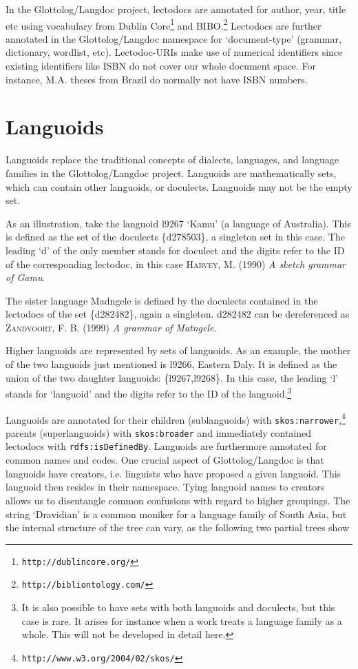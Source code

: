 \documentclass{llncs}
\begin{document}
In the Glottolog/Langdoc project, lectodocs are annotated for author, year, title etc using vocabulary from Dublin Core\footnote{\texttt{http://dublincore.org/}} and BIBO.\footnote{\texttt{http://bibliontology.com/}} Lectodocs are further annotated in the Glottolog/Langdoc namespace for `document-type' (grammar, dictionary, wordlist, etc). Lectodoc-URIs make use of numerical identifiers since existing identifiers like ISBN do not cover our whole document space. For instance, M.A. theses from Brazil do normally not have ISBN numbers.

\section{Languoids}
Languoids replace the traditional concepts of dialects, languages, and language families in the Glottolog/Langdoc project. Languoids are mathematically sets, which can contain other languoids, or doculects. Languoids may not be the empty set.

As an illustration, take the languoid l9267  `Kamu' (a language of Australia). This is defined as the set of the doculects \{d278503\}, a singleton set in this case. The leading `d' of the only member stands for doculect and the digits refer to the ID of the corresponding lectodoc, in this case \textsc{Harvey}, M. (1990) \textit{A sketch grammar of Gamu}.   

The sister language Madngele is defined by the doculects contained in the lectodocs of the set  \{d282482\}, again a singleton.   d282482 can be dereferenced as \textsc{Zandvoort, F. B.} (1999) \textit{A grammar of Matngele}.

Higher languoids are represented by sets of languoids. As an example, the mother of the two languoids just mentioned is l9266, Eastern Daly. It is defined as the union of the two daughter languoids: \{l9267,l9268\}. In this case, the leading `l'  stands for `languoid' and the digits refer to the ID of the languoid.\footnote{It is also possible to have sets with both languoids and doculects, but this case is rare. It arises for instance when a work treats a language family as a whole. This will not be developed in detail here.}

Languoids are annotated for their children (sublanguoids) with \texttt{skos:narrower},\footnote{\texttt{http://www.w3.org/2004/02/skos/}} parents (superlanguoids) with \texttt{skos:broader} and immediately contained lectodocs with \texttt{rdfs:isDefinedBy}. Languoids are furthermore annotated for common names and codes. One crucial aspect of Glottolog/Langdoc is that languoids have creators, i.e. linguists who have proposed a given languoid. This languoid then resides in their namespace. Tying languoid names to creators allows us to disentangle common confusions with regard to higher groupings. The string `Dravidian' is a common moniker for a language family of South Asia, but the internal structure of the tree can vary, as the following two partial trees show
\end{document}
